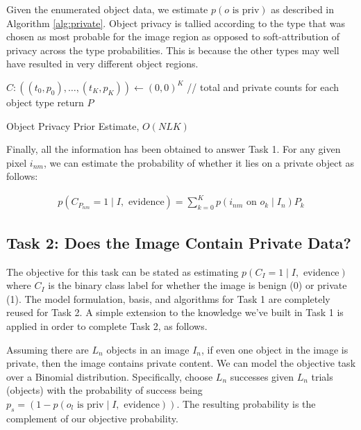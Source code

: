 \documentclass[11pt]{article}
\begin{document}
Given the enumerated object data, we estimate $p(o \textrm{ is priv})$ as described in Algorithm \ref{alg:private}.  Object privacy is tallied according to the type that was chosen as most probable for the image region as opposed to soft-attribution of privacy across the type probabilities.  This is because the other types may well have resulted in very different object regions.

\begin{algorithm}[h!]\label{alg:private}
	$C: ((t_0, p_0), \dots, (t_K, p_K)) \leftarrow (0,0)^K$ // total and private counts for each object type\;
	return $P$\;
\caption{Object Privacy Prior Estimate, $O(NL  K)$}
\end{algorithm}

Finally, all the information has been obtained to answer Task 1.  For any given pixel $i_{nm}$, we can estimate the probability of whether it lies on a private object as follows:

\begin{align}
    p(C_{P_{nm}} = 1 \mid I, \textrm{ evidence}) = \sum_{k=0}^{K} p(i_{nm} \textrm{ on } o_k \mid I_n) P_k
\end{align}


\subsection{Task 2: Does the Image Contain Private Data?}

The objective for this task can be stated as estimating $p(C_I = 1 \mid I, \textrm{ evidence})$ where $C_I$ is the binary class label for whether the image is benign (0) or private (1).  The model formulation, basis, and algorithms for Task 1 are completely reused for Task 2.  A simple extension to the knowledge we've built in Task 1 is applied in order to complete Task 2, as follows.

Assuming there are $L_n$ objects in an image $I_n$, if even one object in the image is private, then the image contains private content.  We can model the objective task over a Binomial distribution.  Specifically, choose $L_n$ successes given $L_n$ trials (objects) with the probability of success being $p_s = (1-p(o_l \textrm{ is priv} \mid I, \textrm{ evidence}))$.  The resulting probability is the complement of our objective probability.
\end{document}
